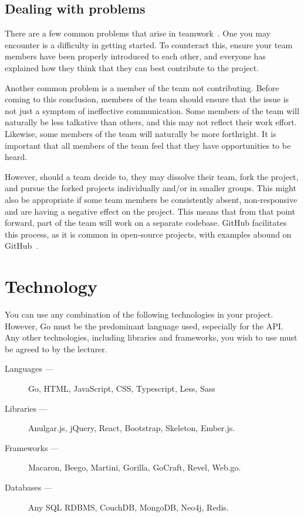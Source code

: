 \subsection*{Dealing with problems}
There are a few common problems that arise in teamwork~\cite{teamworkproblems}.
One you may encounter is a difficulty in getting started.
To counteract this, ensure your team members have been properly introduced to each other, and everyone has explained how they think that they can best contribute to the project.

Another common problem is a member of the team not contributing.
Before coming to this conclusion, members of the team should ensure that the issue is not just a symptom of ineffective communication.
Some members of the team will naturally be less talkative than others, and this may not reflect their work effort.
Likewise, some members of the team will naturally be more forthright.
It is important that all members of the team feel that they have opportunities to be heard.

However, should a team decide to, they may dissolve their team, fork the project, and pursue the forked projects individually and/or in smaller groups.
This might also be appropriate if some team members be consistently absent, non-responsive and are having a negative effect on the project.
This means that from that point forward, part of the team will work on a separate codebase.
GitHub facilitates this process, as it is common in open-source projects, with examples abound on GitHub~\cite{githubforking}.

\section*{Technology}
You can use any combination of the following technologies in your project.
However, Go must be the predominant language used, especially for the API.
Any other technologies, including libraries and frameworks, you wish to use must be agreed to by the lecturer.

\begin{description}
\item[Languages ---] Go, HTML, JavaScript, CSS, Typescript, Less, Sass
\item[Libraries ---] Anulgar.js, jQuery, React, Bootstrap, Skeleton, Ember.js.
\item[Frameworks ---] Macaron, Beego, Martini, Gorilla, GoCraft, Revel, Web.go.
\item[Databases ---] Any SQL RDBMS, CouchDB, MongoDB, Neo4j, Redis.
\end{description}

